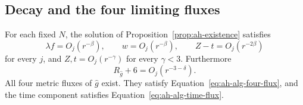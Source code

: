 \subsection{Decay and the four limiting fluxes}
\label{subsec:ah-end}

\begin{lemma}\label{lem:ah-end}
For each fixed \(N\), the solution of Proposition~\ref{prop:ah-existence}
satisfies
\[
 \lambda f=O_j(r^{-\beta}),\qquad
 w=O_j(r^{-\beta}),\qquad
 Z-t=O_j(r^{-2\beta})
\]
for every \(j\), and \(Z,t=O_j(r^{-\gamma})\) for every \(\gamma<3\).
Furthermore
\[
 R_{\widehat g}+6=O_j(r^{-3-\delta}).
\]
All four metric fluxes of \(\widehat g\) exist. They satisfy
Equation~\eqref{eq:ah-alg-four-flux}, and the time component satisfies
Equation~\eqref{eq:ah-alg-time-flux}.
\end{lemma}

